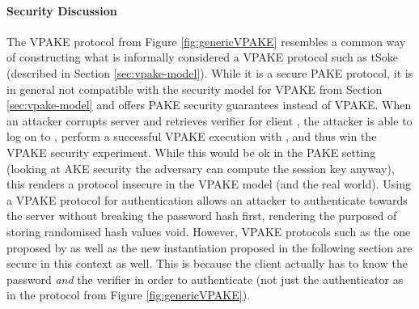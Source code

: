 \paragraph{Security Discussion}
The \ac{VPAKE} protocol from Figure \ref{fig:genericVPAKE} resembles a common way of constructing what is informally considered a \ac{VPAKE} protocol such as tSoke (described in Section \ref{sec:vpake-model}).
While it is a secure \ac{PAKE} protocol, it is in general not compatible with the security model for \ac{VPAKE} from Section \ref{sec:vpake-model} and offers \ac{PAKE} security guarantees instead of \ac{VPAKE}.
When an attacker corrupts server \Server and retrieves verifier \ver for client \Client, the attacker is able to log on to \Server, \ie perform a successful \ac{VPAKE} execution with \Server, and thus win the \ac{VPAKE} security experiment.
While this would be ok in the \ac{PAKE} setting (looking at \ac{AKE} security the adversary can compute the session key anyway), this renders a protocol insecure in the \ac{VPAKE} model (and the real world).
Using a \ac{VPAKE} protocol for authentication allows an attacker to authenticate towards the server without breaking the password hash first, \ie rendering the purposed of storing randomised hash values void.
However, \ac{VPAKE} protocols such as the one proposed by \citet{BenhamoudaP13} as well as the new instantiation proposed in the following section are secure in this context as well.
This is because the client actually has to know the password \emph{and} the verifier in order to authenticate (not just the authenticator as in the protocol from Figure \ref{fig:genericVPAKE}).

